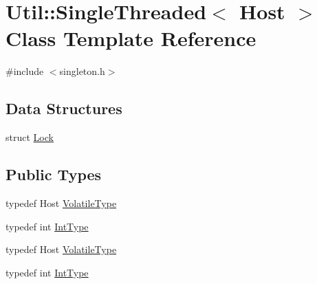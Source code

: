\hypertarget{classUtil_1_1SingleThreaded}{}\section{Util\+:\+:Single\+Threaded$<$ Host $>$ Class Template Reference}
\label{classUtil_1_1SingleThreaded}


{\ttfamily \#include $<$singleton.\+h$>$}

\subsection*{Data Structures}
\begin{DoxyCompactItemize}
\item 
struct \mbox{\hyperlink{structUtil_1_1SingleThreaded_1_1Lock}{Lock}}
\end{DoxyCompactItemize}
\subsection*{Public Types}
\begin{DoxyCompactItemize}
\item 
typedef Host \mbox{\hyperlink{classUtil_1_1SingleThreaded_a2181651ae6fb27288205435da7c5df22}{Volatile\+Type}}
\item 
typedef int \mbox{\hyperlink{classUtil_1_1SingleThreaded_a35932213fb0c15a7b67ced79bc2af4c6}{Int\+Type}}
\item 
typedef Host \mbox{\hyperlink{classUtil_1_1SingleThreaded_a2181651ae6fb27288205435da7c5df22}{Volatile\+Type}}
\item 
typedef int \mbox{\hyperlink{classUtil_1_1SingleThreaded_a35932213fb0c15a7b67ced79bc2af4c6}{Int\+Type}}
\end{DoxyCompactItemize}
